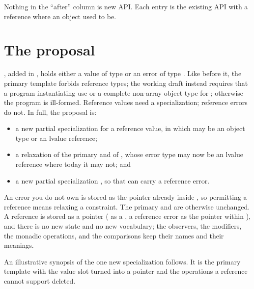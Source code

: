 \documentclass[a4paper,10pt,oneside,openany,final,article]{memoir}
\begin{document}
Nothing in the ``after'' column is new API. Each entry is the existing
 API with a reference where an object used to be.

\chapter{The proposal}

 \cite{P0323R12}, added in \CppXXIII{}, holds either
a value of type  or an error of type . Like
 before it, the primary template forbids reference types;
the working draft instead requires that a program instantiating
 use  or a complete non-array object type for
; otherwise the program is ill-formed. Reference values need a
specialization; reference errors do not. In full, the proposal is:

\begin{itemize}
\item a new partial specialization  for a reference
  value, in which  may be an object type or an lvalue reference;
\item a relaxation of the primary  and of
  , whose error type  may now be an lvalue
  reference where today it may not; and
\item a new partial specialization , so that
   can carry a reference error.
\end{itemize}

An error you do not own is stored as the pointer already inside
, so permitting a reference  means relaxing a
constraint. The primary
 and  are otherwise unchanged.
A reference is stored as a pointer ( as a , a reference
error as the pointer within ), and there is no new
state and no new vocabulary; the observers, the modifiers, the monadic
operations, and the comparisons keep their names and their meanings.

An illustrative synopsis of the one new specialization follows. It is the
primary template with the value slot turned into a pointer and the operations a
reference cannot support deleted.
\end{document}
